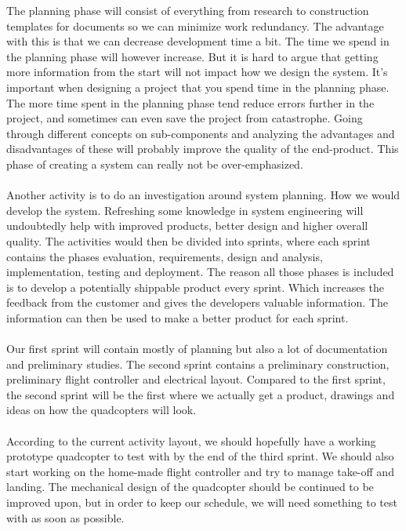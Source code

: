 The planning phase will consist of everything from research to construction templates for documents so we can minimize work redundancy. The advantage with this is that we can decrease development time a bit. The time we spend in the planning phase will however increase. But it is hard to argue that getting more information from the start will not impact how we design the system. It's important when designing a project that you spend time in the planning phase. The more time spent in the planning phase tend reduce errors further in the project, and sometimes can even save the project from catastrophe. Going through different concepts on sub-components and analyzing the advantages and disadvantages of these will probably improve the quality of the end-product. This phase of creating a system can really not be over-emphasized. \\
\\
Another activity is to do an investigation around system planning. How we would develop the system. Refreshing some knowledge in system engineering will undoubtedly help with improved products, better design and higher overall quality.
The activities would then be divided into sprints, where each sprint contains the phases evaluation, requirements, design and analysis, implementation, testing and deployment. The reason all those phases is included is to develop a potentially shippable product every sprint. Which increases the feedback from the customer and gives the developers valuable information. The information can then be used to make a better product for each sprint. \\
\\
Our first sprint will contain mostly of planning but also a lot of documentation and preliminary studies. The second sprint contains a preliminary construction, preliminary flight controller and electrical layout. Compared to the first sprint, the second sprint will be the first where we actually get a product, drawings and ideas on how the quadcopters will look. \\
\\
According to the current activity layout, we should hopefully have a working prototype quadcopter to test with by the end of the third sprint. We should also start working on the home-made flight controller and try to manage take-off and landing. The mechanical design of the quadcopter should be continued to be improved upon, but in order to keep our schedule, we will need something to test with as soon as possible. \\
